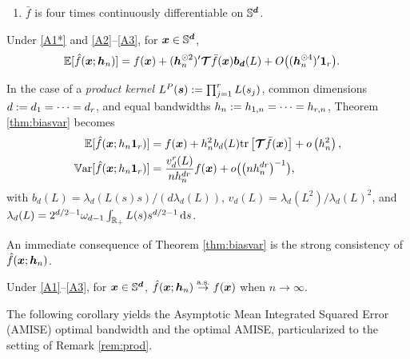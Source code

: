 \documentclass[oneside,11pt]{article}
\begin{document}
\begin{enumerate}[label=\textbf{A\arabic{*}*}., ref=\textbf{A\arabic{*}*}]
    \item $\bar{f}$ is four times continuously differentiable on $\mathbb{S}^{\boldsymbol{d}}$. \label{A1*}
\end{enumerate}

\begin{corollary}\label{cor:bias:order}
Under \ref{A1*} and \ref{A2}--\ref{A3}, for $\boldsymbol{x}\in\mathbb{S}^{\boldsymbol{d}}$,
\begin{align*}
    \mathbb{E}[\hat{f}(\boldsymbol{x};{\boldsymbol{h}}_n)]&=f(\boldsymbol{x})+({\boldsymbol{h}}_n^{\odot 2})'\boldsymbol{\mathcal{T}}\bar{f}(\boldsymbol{x})\boldsymbol{b}_{\boldsymbol{d}}(L)+O\big(({\boldsymbol{h}}_n^{\odot 4})'\mathbf{1}_r\big).
\end{align*}
\end{corollary}

\begin{remark} \label{rem:prod}
In the case of a \emph{product kernel} $L^P(\boldsymbol{s}):=\prod_{j=1}^r L(s_j)$, common dimensions $d:= d_1=\cdots=d_r$, and equal bandwidths $h_n:= h_{1,n}=\cdots=h_{r,n}$, Theorem \ref{thm:biasvar} becomes
\begin{align*}
    \mathbb{E}[\hat{f}(\boldsymbol{x};h_n\mathbf{1}_r)]&=f(\boldsymbol{x})+h_n^{2}b_d(L)\mathrm{tr}\left[\boldsymbol{\mathcal{T}}\bar{f}(\boldsymbol{x})\right]+o\left(h_n^2\right),\\
    \mathbb{V}\mathrm{ar}[\hat{f}(\boldsymbol{x};h_n\mathbf{1}_r)]&=\frac{v_{d}^r(L)}{nh_n^{dr}} f(\boldsymbol{x}) +o\big(\big(n h_n^{dr}\big)^{-1}\big),
\end{align*}
with $b_{d}\left(L\right)=\lambda_{d}(L(s)s)/(d\lambda_{d}(L))$, $v_{d}(L)=\lambda_{d}(L^2)/\lambda_{d}(L)^2$, and $\lambda_{d}(L)=2^{d/2-1}\omega_{d-1}\int_{\mathbb{R}_+} L(s) s^{d/2-1}\,\mathrm{d} s$.
\end{remark}

An immediate consequence of Theorem \ref{thm:biasvar} is the strong consistency of $\hat{f}(\boldsymbol{x};{\boldsymbol{h}}_n)$.

\begin{corollary}\label{cor:consist}
Under \ref{A1}--\ref{A3}, for $\boldsymbol{x}\in\mathbb{S}^{\boldsymbol{d}}$, $\hat{f}(\boldsymbol{x};{\boldsymbol{h}}_n)\stackrel{\mathrm{a.s.}}{\to} f(\boldsymbol{x})$ when $n\to\infty$.
\end{corollary}

The following corollary yields the Asymptotic Mean Integrated Squared Error (AMISE) optimal bandwidth and the optimal AMISE, particularized to the setting of Remark \ref{rem:prod}. %
\end{document}
